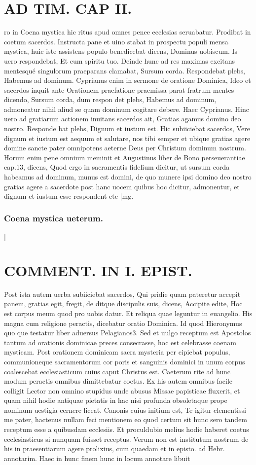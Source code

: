 \documentclass{article}
\begin{document}
\begin{pages}
\section*{AD TIM. CAP II. }
\marginpar{[ p.109 ]}\pstart ro in Coena mystica hic ritus apud omnes penee ecclesias seruabatur. Prodibat in coetum sacerdos. Instructa pane et uino stabat in prospectu populi mensa mystica, huic iste assistens populo benedicebat dicens, Dominus uobiscum. Is uero respondebat, Et cum spiritu tuo. Deinde hunc ad res maximas excitans mentesqué singulorum praeparans clamabat, Sursum corda. Respondebat plebs, Habemus ad dominum. Cyprianus enim in sermone de oratione Dominica, Ideo et sacerdos inquit ante Orationem praefatione praemissa parat fratrum mentes dicendo, Sursum corda, dum respon det plebs, Habemus ad dominum, admoneatur nihil aliud se quam dominum cogitare debere. Haec Cyprianus. Hinc uero ad gratiarum actionem inuitans sacerdos ait, Gratias agamus domino deo nostro. Responde bat plebs, Dignum et iustum est. Hic subiiciebat sacerdos, Vere dignum et iustum est aequum et salutare, nos tibi semper et ubique gratias agere domine sancte pater omnipotens aeterne Deus per Christum dominum nostrum. Horum enim pene omnium meminit et Augustinus liber  de Bono perseuerantiae cap.13, dicens, Quod ergo in sacramentis fidelium dicitur, ut sursum corda habeamus ad dominum, munus est domini, de quo munere ipsi domino deo nostro gratias agere a sacerdote post hanc uocem quibus hoc dicitur, admonentur, et dignum et iustum esse respondent etc  \pend
|mg. \subsubsection*{Coena mystica ueterum. }|
\section*{COMMENT. IN I. EPIST. }\pstart Post ista autem uerba subiiciebat sacerdos, Qui pridie quam pateretur accepit panem, gratias egit, fregit, de ditque discipulis suis, dicens, Accipite edite, Hoc est corpus meum quod pro uobis datur. Et reliqua quae leguntur in euangelio. His magna cum religione peractis, dicebatur oratio Dominica. Id quod Hieronymus quo que testatur liber  aduersus Pelagianos3. Sed et uulgo receptum est Apostolos tantum ad orationis dominicae preces consecrasse, hoc est celebrasse coenam mysticam. Post orationem dominicam sacra mysteria per cipiebat populus, communioneque sacramentorum cor poris et sanguinis dominici in unum corpus coalescebat ecclesiasticum cuius caput Christus est. Caeterum rite ad hunc modum peractis omnibus dimittebatur coetus. Ex his autem omnibus facile colligit Lector non omnino stupidus unde abusus Missae papisticae fluxerit, et quam nihil hodie antiquae pietatis in hac nisi profunda obsoletaque prope nominum uestigia cernere liceat. Canonis cuius initium est, Te igitur clementissi me pater, hactenus nullam feci mentionem eo quod certum sit hunc sero tandem receptum esse a quibusdam ecclesiis. Et proculdubio melius hodie haberet coetus ecclesiasticus si nunquam fuisset receptus. Verum non est institutum nostrum de his in praesentiarum agere prolixius, cum quaedam et in episto. ad Hebr. annotarim. Haec in hunc finem hunc in locum annotare libuit  \pend

\end{pages}
\end{document}
